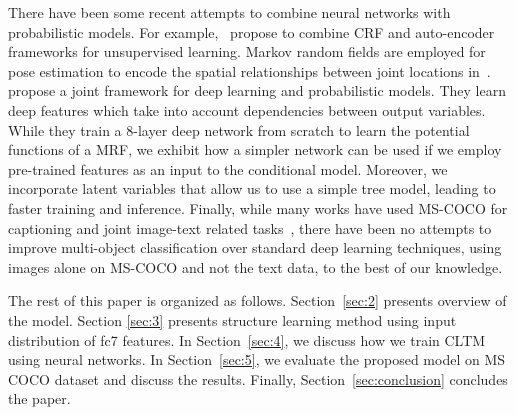 \documentclass{article}
\begin{document}



There have been some recent attempts to combine neural networks with probabilistic models. For example,~\cite{ammar2014conditional} propose to combine CRF and auto-encoder frameworks for unsupervised learning. Markov random fields are employed for  pose estimation to encode the spatial relationships between joint locations in~\cite{tompson2014joint}.~\cite{chen2014learning} propose a joint framework for deep learning and probabilistic models. They learn deep features which take into account dependencies between output variables. While they train a 8-layer deep network from scratch to learn the potential functions of a MRF, we exhibit how a simpler network can be used if we employ pre-trained features as an input to the conditional model. Moreover, we incorporate latent variables that allow us to use a simple tree model, leading to faster training and inference.  Finally, while many works have used MS-COCO for captioning and joint image-text related tasks~\cite{karpathy2014deep,vinyals2014show}, there have been no attempts to improve multi-object classification  over standard deep learning techniques, using images alone on MS-COCO and not the text data, to the best of our knowledge.



The rest of this paper is organized as follows. Section~\ref{sec:2}
presents overview of the model. Section \ref{sec:3} presents structure learning method using input distribution of fc7 features. In Section~\ref{sec:4}, we discuss how we train CLTM using neural networks. In Section~\ref{sec:5}, we evaluate the proposed model on MS COCO dataset and discuss the results.  Finally, Section~\ref{sec:conclusion} concludes the paper.


\end{document}
